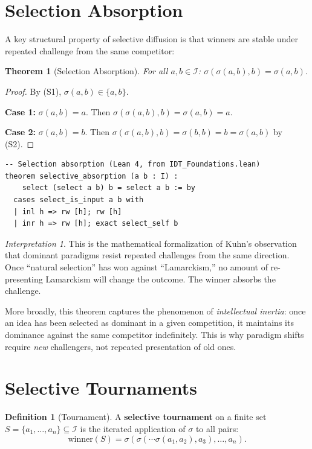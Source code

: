 \documentclass[11pt,openany]{book}
\theoremstyle{definition}
\newtheorem{definition}[axiom]{Definition}
\theoremstyle{plain}
\newtheorem{theorem}[axiom]{Theorem}
\theoremstyle{remark}
\newtheorem{interpretation}[axiom]{Interpretation}
\newcommand{\IS}{\mathcal{I}}               %
\begin{document}
\section{Selection Absorption}

A key structural property of selective diffusion is that winners are stable under repeated challenge from the same competitor:

\begin{theorem}[Selection Absorption]
\label{thm:selection-absorption}
For all $a, b \in \IS$: $\sigma(\sigma(a, b), b) = \sigma(a, b)$.
\end{theorem}

\begin{proof}
By (S1), $\sigma(a, b) \in \{a, b\}$.

\textbf{Case 1:} $\sigma(a, b) = a$. Then $\sigma(\sigma(a, b), b) = \sigma(a, b) = a$.

\textbf{Case 2:} $\sigma(a, b) = b$. Then $\sigma(\sigma(a, b), b) = \sigma(b, b) = b = \sigma(a, b)$ by (S2).
\end{proof}

\begin{lstlisting}
-- Selection absorption (Lean 4, from IDT_Foundations.lean)
theorem selective_absorption (a b : I) :
    select (select a b) b = select a b := by
  cases select_is_input a b with
  | inl h => rw [h]; rw [h]
  | inr h => rw [h]; exact select_self b
\end{lstlisting}

\begin{interpretation}
This is the mathematical formalization of Kuhn's observation that dominant paradigms resist repeated challenges from the same direction. Once ``natural selection'' has won against ``Lamarckism,'' no amount of re-presenting Lamarckism will change the outcome. The winner absorbs the challenge.

More broadly, this theorem captures the phenomenon of \emph{intellectual inertia}: once an idea has been selected as dominant in a given competition, it maintains its dominance against the same competitor indefinitely. This is why paradigm shifts require \emph{new} challengers, not repeated presentation of old ones.
\end{interpretation}

\section{Selective Tournaments}

\begin{definition}[Tournament]
A \textbf{selective tournament} on a finite set $S = \{a_1, \ldots, a_n\} \subseteq \IS$ is the iterated application of $\sigma$ to all pairs:
\[
\mathrm{winner}(S) = \sigma(\sigma(\cdots \sigma(a_1, a_2), a_3), \ldots, a_n).
\]
\end{definition}
\end{document}
